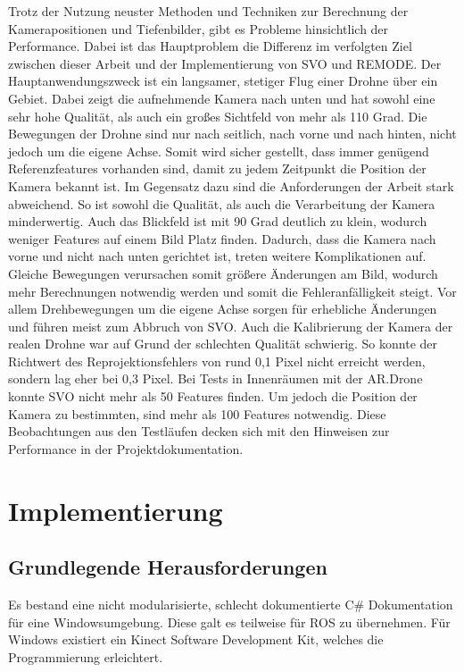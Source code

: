 Trotz der Nutzung neuster Methoden und Techniken zur Berechnung der Kamerapositionen und Tiefenbilder, gibt es Probleme hinsichtlich der Performance. Dabei ist das Hauptproblem die Differenz im verfolgten Ziel zwischen dieser Arbeit und der Implementierung von SVO und REMODE. \newline
Der Hauptanwendungszweck ist ein langsamer, stetiger Flug einer Drohne über ein Gebiet. Dabei zeigt die aufnehmende Kamera nach unten und hat sowohl eine sehr hohe Qualität, als auch ein großes Sichtfeld von mehr als 110 Grad. Die Bewegungen der Drohne sind nur nach seitlich, nach vorne und nach hinten, nicht jedoch um die eigene Achse. Somit wird sicher gestellt, dass immer genügend Referenzfeatures vorhanden sind, damit zu jedem Zeitpunkt die Position der Kamera bekannt ist. \newline
Im Gegensatz dazu sind die Anforderungen der Arbeit stark abweichend. So ist sowohl die Qualität, als auch die Verarbeitung der Kamera minderwertig. Auch das Blickfeld ist mit 90 Grad deutlich zu klein, wodurch weniger Features auf einem Bild Platz finden. \newline
Dadurch, dass die Kamera nach vorne und nicht nach unten gerichtet ist, treten weitere Komplikationen auf. Gleiche Bewegungen verursachen somit größere Änderungen am Bild, wodurch mehr Berechnungen notwendig werden und somit die Fehleranfälligkeit steigt. Vor allem Drehbewegungen um die eigene Achse sorgen für erhebliche Änderungen und führen meist zum Abbruch von SVO. \newline
Auch die Kalibrierung der Kamera der realen Drohne war auf Grund der schlechten Qualität schwierig. So konnte der Richtwert des Reprojektionsfehlers von rund 0,1 Pixel nicht erreicht werden, sondern lag eher bei 0,3 Pixel. \newline
Bei Tests in Innenräumen mit der AR.Drone konnte SVO nicht mehr als 50 Features finden. Um jedoch die Position der Kamera zu bestimmten, sind mehr als 100 Features notwendig.
Diese Beobachtungen aus den Testläufen decken sich mit den Hinweisen zur Performance in der Projektdokumentation\cite{svodocs}. \newline


\newpage
\section{Implementierung}
\subsection{Grundlegende Herausforderungen}
Es bestand eine nicht modularisierte, schlecht dokumentierte C\# Dokumentation für eine Windowsumgebung. Diese galt es teilweise für ROS zu übernehmen. Für Windows existiert ein Kinect Software Development Kit, welches die Programmierung erleichtert.


